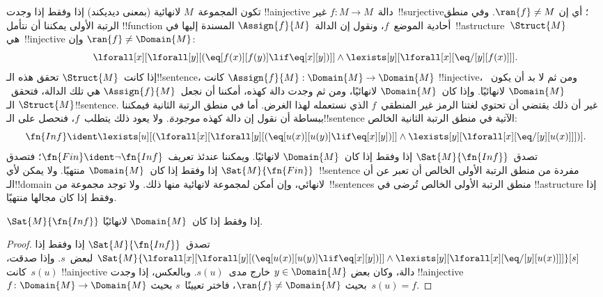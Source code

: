 \documentclass[../../../include/open-logic-section]{subfiles}
\begin{document}


تكون المجموعة~$M$ لانهائية (بمعنى ديديكند) إذا وفقط إذا وجدت
!!a{injective} دالة~$f\colon M \to M$ غير~!!{surjective}؛ أي إن
$\ran{f} \neq M$. وفي منطق الرتبة الأولى يمكننا أن نتأمل
!!{function} أحادية الموضع~$f$، ونقول إن الدالة~$\Assign{f}{M}$
المسندة إليها في~!!a{structure}~$\Struct{M}$ هي~!!{injective} وإن
$\ran{f} \neq \Domain{M}$:
\[
\lforall[x][\lforall[y][(\eq[f(x)][f(y)] \lif \eq[x][y])]] \land
\lexists[y][\lforall[x][\eq/[y][f(x)]]].
\]
إذا كانت~$\Struct{M}$ تحقق هذه الـ!!{sentence}، كانت
$\Assign{f}{M}: \Domain{M} \to \Domain{M}$ !!{injective}،
ومن ثم لا بد أن يكون~$\Domain{M}$ لانهائيًا. وإذا كان~$\Domain{M}$
لانهائيًا، ومن ثم وجدت دالة كهذه، أمكننا أن نجعل~$\Assign{f}{M}$ هي
تلك الدالة، فتحقق~$\Struct{M}$ الـ!!{sentence}. غير أن ذلك يقتضي أن
تحتوي لغتنا الرمز غير المنطقي~$f$ الذي نستعمله لهذا الغرض. أما في
منطق الرتبة الثانية فيمكننا ببساطة أن نقول إن دالة كهذه
\emph{موجودة}. ولا يعود ذلك يتطلب~$f$، فنحصل على الـ!!{sentence}
الآتية في منطق الرتبة الثانية الخالص:
\[
\fn{Inf} \ident \lexists[u][(\lforall[x][\lforall[y][(\eq[u(x)][u(y)]
      \lif \eq[x][y])]] \land \lexists[y][\lforall[x][\eq/[y][u(x)]]])].
\]
تصدق~$\Sat{M}{\fn{Inf}}$ إذا وفقط إذا كان~$\Domain{M}$ لانهائيًا.
ويمكننا عندئذ تعريف~$\fn{Fin} \ident \lnot \fn{Inf}$؛ فتصدق
$\Sat{M}{\fn{Fin}}$ إذا وفقط إذا كان~$\Domain{M}$ منتهيًا. ولا يمكن
لأي~!!{sentence} مفردة من منطق الرتبة الأولى الخالص أن تعبر عن أن
الـ!!{domain} لانهائي، وإن أمكن لمجموعة لانهائية منها ذلك. ولا توجد
مجموعة من~!!{sentence}s منطق الرتبة الأولى الخالص تُرضى في
!!a{structure} إذا وفقط إذا كان مجالها منتهيًا.

\begin{prop}
$\Sat{M}{\fn{Inf}}$ إذا وفقط إذا كان~$\Domain{M}$ لانهائيًا.
\end{prop}

\begin{proof}
تصدق~$\Sat{M}{\fn{Inf}}$ إذا وفقط إذا
  $\Sat{M}{\lforall[x][\lforall[y][(\eq[u(x)][u(y)] \lif \eq[x][y])]]
    \land \lexists[y][\lforall[x][\eq/[y][u(x)]]]}[s]$ لبعض~$s$.
وإذا صدقت، كانت~$s(u)$ !!a{injective} دالة، وكان بعض
$y \in \Domain{M}$ خارج مدى~$s(u)$. وبالعكس، إذا وجدت
!!a{injective}~$f\colon \Domain{M} \to \Domain{M}$ بحيث
$\ran{f} \neq \Domain{M}$، فاختر تعيينًا~$s$ بحيث~$s(u) = f$.
\end{proof}
\end{document}
